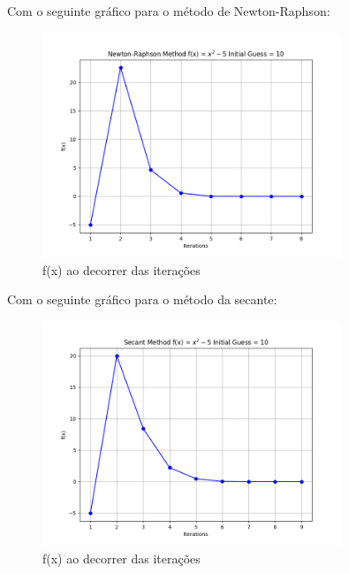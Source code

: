 \documentclass[12pt, a4paper]{article} %
\begin{document}
            Com o seguinte gr\'afico para o m\'etodo de Newton-Raphson:
            \begin{figure}[H]
                \centering
                \includegraphics[width=0.8\textwidth]{../images/grafic-ex-2-newton-raphson-method-10.png}
                \caption{f(x) ao decorrer das itera\c{c}\~oes}
            \end{figure}
            Com o seguinte gr\'afico para o m\'etodo da secante:
            \begin{figure}[H]
                \centering
                \includegraphics[width=0.8\textwidth]{../images/grafic-ex-2-secant-method-10.png}
                \caption{f(x) ao decorrer das itera\c{c}\~oes}
            \end{figure}
\end{document}
